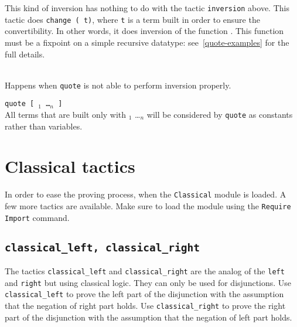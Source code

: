 \begin{coq_example*}
This kind of inversion has nothing to do with the tactic
\texttt{inversion} above. This tactic does \texttt{change (\ident\
  t)}, where \texttt{t} is a term built in order to ensure the
convertibility. In other words, it does inversion of the function
\ident. This function must be a fixpoint on a simple recursive
datatype: see~\ref{quote-examples} for the full details.

\begin{ErrMsgs}
\item {}\\
  Happens when \texttt{quote} is not able to perform inversion properly.
\end{ErrMsgs}

\begin{Variants}
\item \texttt{quote {\ident} [ \ident$_1$ \dots \ident$_n$ ]}\\
  All terms that are built only with \ident$_1$ \dots \ident$_n$ will be
  considered by \texttt{quote} as constants rather than variables.
\end{Variants}


\section[Classical tactics]{Classical tactics\label{ClassicalTactics}}

In order to ease the proving process, when the {\tt Classical} module is loaded. A few more tactics are available. Make sure to load the module using the \texttt{Require Import} command.

\subsection{{\tt classical\_left, classical\_right}  }

The tactics \texttt{classical\_left} and \texttt{classical\_right} are the analog of the \texttt{left} and \texttt{right} but using classical logic. They can only be used for disjunctions.
Use  \texttt{classical\_left} to prove the left part of the disjunction with the assumption that the negation of right part holds.
Use \texttt{classical\_right} to prove the right part of the disjunction with the assumption that the negation of left part holds.


\end{coq_example*}
